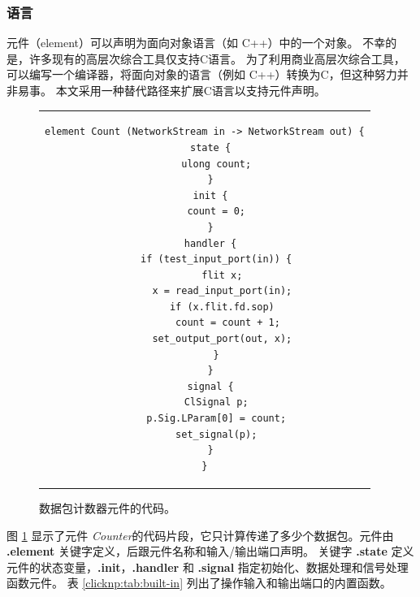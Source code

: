 \subsubsection{语言}


\name 元件（element）可以声明为面向对象语言（如 C++）中的一个对象。
不幸的是，许多现有的高层次综合工具仅支持C语言。
为了利用商业高层次综合工具，可以编写一个编译器，将面向对象的语言（例如 C++）转换为C，但这种努力并非易事。
本文采用一种替代路径来扩展C语言以支持元件声明。




\begin{figure}[htbp]
\small
\centering
\begin{tabular}{c}
\begin{lstlisting}
element Count (NetworkStream in -> NetworkStream out) {
  state {
    ulong count;
  }
  init {
    count = 0;
  }
  handler {
    if (test_input_port(in)) {
      flit x;
      x = read_input_port(in);
      if (x.flit.fd.sop)
        count = count + 1;
      set_output_port(out, x);
    }
  }
  signal {
    ClSignal p;
    p.Sig.LParam[0] = count;
    set_signal(p);
  }
}
\end{lstlisting}
\end{tabular}
	\caption{数据包计数器元件的代码。}
	\label{clicknp:fig:count-element}
\end{figure}


图 \ref{clicknp:fig:count-element} 显示了元件 \textit {Counter}的代码片段，它只计算传递了多少个数据包。元件由 \textbf {.element} 关键字定义，后跟元件名称和输入/输出端口声明。
关键字 \textbf {.state} 定义元件的状态变量，\textbf {.init}，\textbf {.handler} 和 \textbf {.signal} 指定初始化、数据处理和信号处理函数元件。
表 \ref {clicknp:tab:built-in} 列出了操作输入和输出端口的内置函数。


